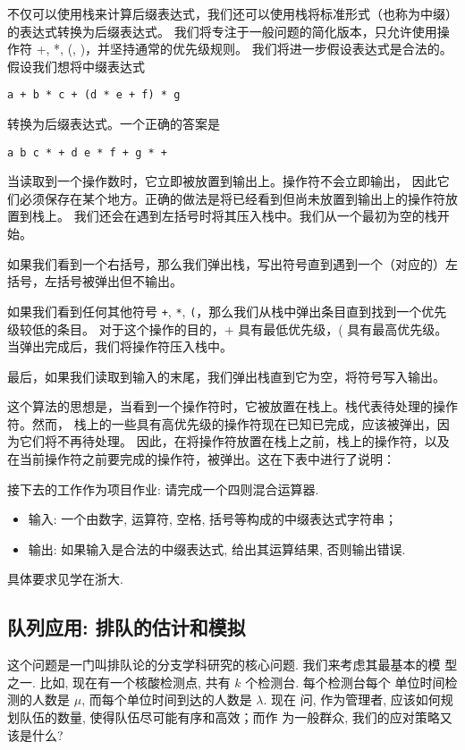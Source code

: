 \documentclass[a4paper]{ctexart}
\theoremstyle{definition}
\theoremstyle{definition}
\begin{document}
不仅可以使用栈来计算后缀表达式，我们还可以使用栈将标准形式（也称为中缀）的表达式转换为后缀表达式。
我们将专注于一般问题的简化版本，只允许使用操作符 +, *, (, )，并坚持通常的优先级规则。
我们将进一步假设表达式是合法的。假设我们想将中缀表达式

\begin{verbatim}
a + b * c + (d * e + f) * g  
\end{verbatim}

转换为后缀表达式。一个正确的答案是 
\begin{verbatim}
a b c * + d e * f + g * +  
\end{verbatim}

当读取到一个操作数时，它立即被放置到输出上。操作符不会立即输出，
因此它们必须保存在某个地方。正确的做法是将已经看到但尚未放置到输出上的操作符放置到栈上。
我们还会在遇到左括号时将其压入栈中。我们从一个最初为空的栈开始。

如果我们看到一个右括号，那么我们弹出栈，写出符号直到遇到一个（对应的）左括号，左括号被弹出但不输出。

如果我们看到任何其他符号 \verb|+|, \verb|*|, \verb|(|，那么我们从栈中弹出条目直到找到一个优先级较低的条目。
对于这个操作的目的，+ 具有最低优先级，( 具有最高优先级。当弹出完成后，我们将操作符压入栈中。

最后，如果我们读取到输入的末尾，我们弹出栈直到它为空，将符号写入输出。

这个算法的思想是，当看到一个操作符时，它被放置在栈上。栈代表待处理的操作符。然而，
栈上的一些具有高优先级的操作符现在已知已完成，应该被弹出，因为它们将不再待处理。
因此，在将操作符放置在栈上之前，栈上的操作符，以及在当前操作符之前要完成的操作符，被弹出。这在下表中进行了说明：


接下去的工作作为项目作业: 请完成一个四则混合运算器.
\begin{itemize}
\item 输入: 一个由数字, 运算符, 空格, 括号等构成的中缀表达式字符串；
\item 输出: 如果输入是合法的中缀表达式, 给出其运算结果, 否则输出错误.
\end{itemize}
具体要求见学在浙大. 

\subsection{队列应用: 排队的估计和模拟}

这个问题是一门叫排队论的分支学科研究的核心问题. 我们来考虑其最基本的模
型之一. 比如, 现在有一个核酸检测点, 共有 $k$ 个检测台. 每个检测台每个
单位时间检测的人数是 $\mu$, 而每个单位时间到达的人数是 $\lambda$. 现在
问, 作为管理者, 应该如何规划队伍的数量, 使得队伍尽可能有序和高效；而作
为一般群众, 我们的应对策略又该是什么? 
\end{document}
